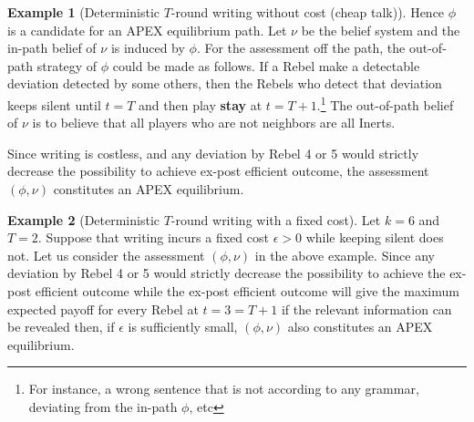 \documentclass[12pt,letter]{article}
\theoremstyle{definition}
\newtheorem{example}{Example}
\theoremstyle{remark}
\theoremstyle{claim}
\begin{document}
\begin{example}[Deterministic $T$-round writing without cost (cheap talk)]
Hence $\phi$ is a candidate for an APEX equilibrium path. Let $\nu$ be the belief system and the in-path belief of $\nu$ is induced by $\phi$. For the assessment off the path, the out-of-path strategy of $\phi$ could be made as follows. If a Rebel make a detectable deviation detected by some others, then the Rebels who detect that deviation keeps silent until $t=T$ and then play \textbf{stay} at $t=T+1$.\footnote{For instance, a wrong sentence that is not according to any grammar, deviating from the in-path $\phi$, etc} 
The out-of-path belief of $\nu$ is to believe that all players who are not neighbors are all Inerts. 

Since writing is costless, and any deviation by Rebel 4 or 5 would strictly decrease the possibility to achieve ex-post efficient outcome, the assessment $(\phi,\nu)$ constitutes an APEX equilibrium.

\end{example}


\begin{example}[Deterministic $T$-round writing with a fixed cost]
\label{ex:fixed_cost_talk}
Let $k=6$ and $T=2$. Suppose that writing incurs a fixed cost $\epsilon>0$ while keeping silent does not. Let us consider the assessment $(\phi,\nu)$ in the above example. Since any deviation by Rebel 4 or 5 would strictly decrease the possibility to achieve the ex-post efficient outcome while the ex-post efficient outcome will give the maximum expected payoff for every Rebel at $t=3=T+1$ if the relevant information can be revealed then, if $\epsilon$ is sufficiently small, $(\phi,\nu)$ also constitutes an APEX equilibrium.

\end{example}
\end{document}
